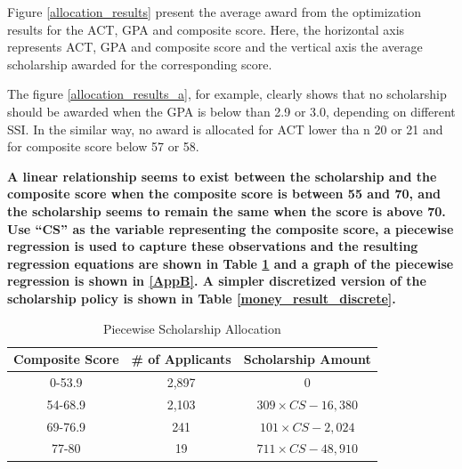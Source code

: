 \documentclass[12pt,english]{report}
\begin{document}
Figure \ref{allocation_results} present the average award from the
optimization results for the ACT, GPA and composite score. Here, the
horizontal axis represents ACT, GPA and composite score and the vertical axis
the average scholarship awarded for the corresponding score.

%

The figure \ref{allocation_results_a}, for example, clearly shows that
no scholarship should be awarded when the GPA is below than 2.9 or 3.0,
depending
on different SSI. In the similar way, no award is allocated for ACT lower tha
n 20 or 21 and for composite score below 57 or 58.

\textbf{
A linear relationship seems to exist between the scholarship and the
composite score when the composite score is between 55 and 70, and the
scholarship seems to remain the same when the score is above 70.
Use ``CS'' as the variable representing the composite score, a piecewise
regression is used to capture these observations and the resulting regression
equations are shown in Table \ref{money_result} and a graph of the piecewise
regression is shown in \ref{AppB}. A simpler discretized version of the
scholarship policy is shown in Table \ref{money_result_discrete}. }

\begin{table}[ht]
\centering
\begin{tabular}{|c|c|c|}
\hline
Composite Score & \# of Applicants & Scholarship Amount \\ \hline
0-53.9         & 2,897	&0              \\ \hline
54-68.9        & 2,103  &$309\times CS -16,380 $            \\ \hline
69-76.9        &  241 &  $101\times CS - 2,024$           \\ \hline
77-80       & 19 &   $711 \times CS -48,910$          \\ \hline
\end{tabular}
\caption{Piecewise Scholarship Allocation}
\label{money_result}
\end{table}
\end{document}
